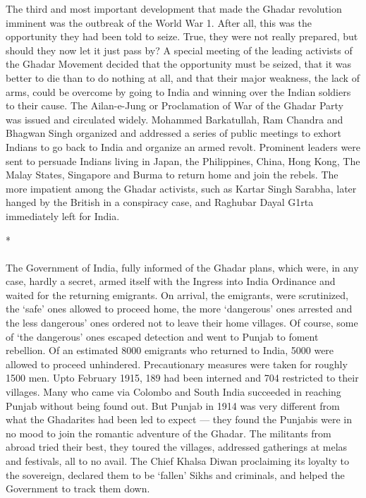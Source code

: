The third and most important development that made the Ghadar revolution imminent was the outbreak of the World War 1. After all, this was the opportunity they had been told to seize. True, they were not really prepared, but should they now let it just pass by? A special meeting of the leading activists of the Ghadar Movement decided that the opportunity must be seized, that it was better to die than to do nothing at all, and that their major weakness, the lack of arms, could be overcome by going to India and winning over the Indian soldiers to their cause. The Ailan-e-Jung or Proclamation of War of the Ghadar Party was issued and circulated widely. Mohammed Barkatullah, Ram Chandra and Bhagwan Singh organized and addressed a series of public meetings to exhort Indians to go back to India and organize an armed revolt. Prominent leaders were sent to persuade Indians living in Japan, the Philippines, China, Hong Kong, The Malay States, Singapore and Burma to return home and join the rebels. The more impatient among the Ghadar activists, such as Kartar Singh Sarabha, later hanged by the British in a conspiracy case, and Raghubar Dayal G1rta immediately left for India.

\begin{center}*\end{center}

\paragraph*{}

The Government of India, fully informed of the Ghadar plans, which were, in any case, hardly a secret, armed itself with the Ingress into India Ordinance and waited for the returning emigrants. On arrival, the emigrants, were scrutinized, the `safe' ones allowed to proceed home, the more `dangerous' ones arrested and the less dangerous' ones ordered not to leave their home villages. Of course, some of `the dangerous' ones escaped detection and went to Punjab to foment rebellion. Of an estimated 8000 emigrants who returned to India, 5000 were allowed to proceed unhindered. Precautionary measures were taken for roughly 1500 men. Upto February 1915, 189 had been interned and 704 restricted to their villages. Many who came via Colombo and South India succeeded in reaching Punjab without being found out. But Punjab in 1914 was very different from what the Ghadarites had been led to expect --- they found the Punjabis were in no mood to join the romantic adventure of the Ghadar. The militants from abroad tried their best, they toured the villages, addressed gatherings at melas and festivals, all to no avail. The Chief Khalsa Diwan proclaiming its loyalty to the sovereign, declared them to be `fallen' Sikhs and criminals, and helped the Government to track them down.

